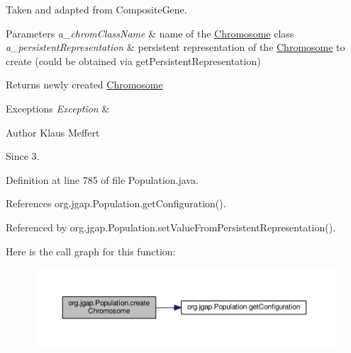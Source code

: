 Taken and adapted from Composite\-Gene.


\begin{DoxyParams}{Parameters}
{\em a\-\_\-chrom\-Class\-Name} & name of the \hyperlink{classorg_1_1jgap_1_1_chromosome}{Chromosome} class \\
\hline
{\em a\-\_\-persistent\-Representation} & persistent representation of the \hyperlink{classorg_1_1jgap_1_1_chromosome}{Chromosome} to create (could be obtained via get\-Persistent\-Representation)\\
\hline
\end{DoxyParams}
\begin{DoxyReturn}{Returns}
newly created \hyperlink{classorg_1_1jgap_1_1_chromosome}{Chromosome} 
\end{DoxyReturn}

\begin{DoxyExceptions}{Exceptions}
{\em Exception} & \\
\hline
\end{DoxyExceptions}
\begin{DoxyAuthor}{Author}
Klaus Meffert 
\end{DoxyAuthor}
\begin{DoxySince}{Since}
3. 
\end{DoxySince}


Definition at line 785 of file Population.\-java.



References org.\-jgap.\-Population.\-get\-Configuration().



Referenced by org.\-jgap.\-Population.\-set\-Value\-From\-Persistent\-Representation().



Here is the call graph for this function\-:
\nopagebreak
\begin{figure}[H]
\begin{center}
\leavevmode
\includegraphics[width=350pt]{classorg_1_1jgap_1_1_population_a62348bfaa285efe11845574496d7a14c_cgraph}
\end{center}
\end{figure}


